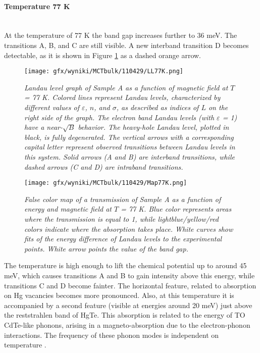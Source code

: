 \documentclass[titlepage,a4paper]{book}
\newcommand{\wciecie}{\quad\phantom{v}}
\newcommand{\myparagraph}[1]{\paragraph{#1}\mbox{}\\}
\begin{document}
\myparagraph{Temperature 77 K}
\wciecie
At the temperature of 77 K the band gap increases further to 36 meV. The transitions A, B, and C are still visible. A new interband transition D becomes detectable, as it is shown in Figure \ref{fig:LL_110429_77K} as a dashed orange arrow.
\begin{figure}[H]
	\centering
	\texttt{[image: gfx/wyniki/MCTbulk/110429/LL77K.png]}
	\vspace{-10pt}
	\caption{\textit{Landau level graph of Sample A as a function of magnetic field at $T$ = 77 K. Colored lines represent Landau levels, characterized by different values of $\varepsilon$, $n$, and $\sigma$, as described as indices of $L$ on the right side of the graph. The electron band Landau levels (with $\varepsilon$ = 1) have a near-$\sqrt{B}$ behavior. The heavy-hole Landau level, plotted in black, is fully degenerated. The vertical arrows with a corresponding capital letter represent observed transitions between Landau levels in this system. Solid arrows (A and B) are interband transitions, while dashed arrows (C and D) are intraband transitions.}}
	\label{fig:LL_110429_77K}
\end{figure}

\begin{figure}[ht]
	\centering
	\texttt{[image: gfx/wyniki/MCTbulk/110429/Map77K.png]}
	\vspace{-10pt}
	\caption{\textit{False color map of a transmission of Sample A as a function of energy and magnetic field at $T$ = 77 K. Blue color represents areas where the transmission is equal to 1, while lightblue/yellow/red colors indicate where the absorption takes place. White curves show fits of the energy difference of Landau levels to the experimental points. White arrow points the value of the band gap.}}
	\label{fig:Map_110429_77K}
\end{figure} 

The temperature is high enough to lift the chemical potential up to around 45 meV, which causes transitions A and B to gain intensity above this energy, while transitions C and D become fainter. The horizontal feature, related to absorption on Hg vacancies becomes more pronounced. Also, at this temperature it is accompanied by a second feature (visible at energies around 20 meV) just above the reststrahlen band of HgTe. This absorption is related to the energy of TO CdTe-like phonons, arising in a magneto-absorption due to the electron-phonon interactions. The frequency of these phonon modes is independent on temperature \cite{Sheregii_MCT_bulk}.
\end{document}
